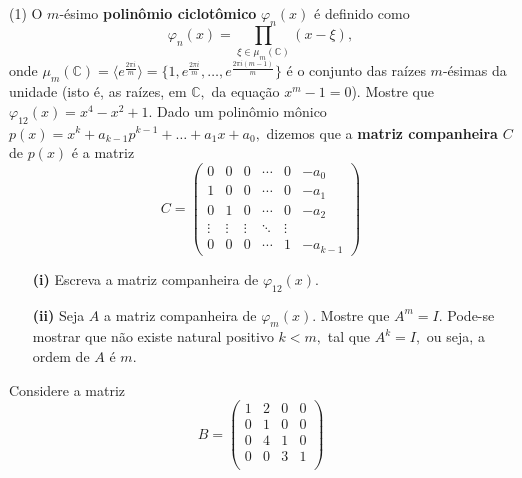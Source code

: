 \documentclass[12pt, a4paper]{article}
\newcommand{\negrito}[1]{\mbox{\boldmath{$#1$}}}
\begin{document}
\begin{tasks}[counter-format={(tsk[a])},label-width=3.6ex, label-format = {\bfseries}, column-sep = {0pt}](1)
\task[\textcolor{Floresta}{$\negrito{(a)} $}] O $m$-ésimo \textbf{polinômio ciclotômico} $\varphi_n(x)$ é definido como 
\[
\varphi_n(x) = \prod\limits_{\xi \in \mu_m(\mathbb{C})} (x - \xi),
\]
onde $\mu_m(\mathbb{C}) = \langle e^{\frac{2 \pi i}{m}} \rangle = \{1, e^{\frac{2 \pi i}{m}}, \ldots, e^{\frac{2 \pi i (m-1)}{m}} \}$ é o conjunto das raízes $m$-ésimas da unidade (isto é, as raízes, em $\mathbb{C},$ da equação $x^m - 1 = 0$). Mostre que $\varphi_{12}(x) = x^{4} - x^2 + 1.$
\task[\textcolor{Floresta}{$\negrito{(b)} $}] Dado um polinômio mônico $p(x) = x^k + a_{k-1}p^{k-1} + \ldots + a_1x + a_0,$ dizemos que a \textbf{matriz companheira} $C$ de $p(x)$ é a matriz
\[
C = \left(\begin{array}{cccccc}
0 & 0 & 0 & \cdots & 0 &-a_0 \\
1 & 0 & 0 & \cdots & 0 &-a_1 \\
0 & 1 & 0 & \cdots & 0 &-a_2 \\
\vdots & \vdots & \vdots & \ddots & \vdots \\
0 & 0 & 0 & \cdots & 1 &-a_{k-1} 
\end{array}\right)
\]
\begin{itemize}
\item[\textbf{(i)}] Escreva a matriz companheira de $\varphi_{12}(x).$
\item[\textbf{(ii)}] Seja $A$ a matriz companheira de $\varphi_m(x).$ Mostre que $A^m = I.$ Pode-se mostrar que não existe natural positivo $k < m,$ tal que $A^k = I,$ ou seja, a ordem de $A$ é $m.$
\end{itemize}
\task[\textcolor{Floresta}{$\negrito{(c)} $}] Considere a matriz
\[
B = \left(\begin{array}{cccc}
1 & 2 & 0 & 0\\
0 & 1 & 0 & 0\\
0 & 4 & 1 & 0\\
0 & 0 & 3 & 1\\
\end{array}\right)
\]


\end{tasks}
\end{document}
